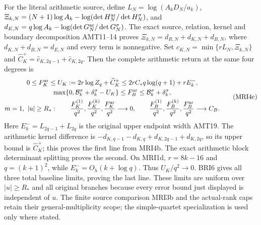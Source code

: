 \documentclass[11pt,a4paper]{article}
\begin{document}
For the literal arithmetic source, define
$L_N=\log(A_kD_N/a_k)$,
$\Xi_{k,N}=(N+1)\log A_k-\log(\det H_N^{\rm ar}/\det H_N^\sigma)$,
and $d_{E,N}=q\log A_k-\log(\det G_N^{\rm ar}/\det G_N^\sigma)$.
The exact source, relation, kernel and boundary decomposition
AMT11--14 proves $\Xi_{k,N}=d_{R,N}+d_{K,N}+d_{B,N}$,
where $d_{K,N}+d_{B,N}=d_{E,N}$ and every term is nonnegative.
Set $\widehat c_{K,N}=\min\{rL_N,\Xi_{k,N}\}$ and
$\widehat C_K^+=\widehat c_{K,2q-1}+\widehat c_{K,2q}$.
Then the complete arithmetic return at the same four degrees is
\[
\begin{gathered}
 0\le F_K^{\rm ar}\le U_K:=2r\log Z_q+\widehat C_K^+
              \le2rC_*q\log(q+1)+rE_k^-,\\
 \max\{0,\mathcal B_k^\sigma+\delta_k^\sigma-U_K\}
       \le F_B^{\rm ar}\le\mathcal B_k^\sigma+\delta_k^\sigma,\\
 m=1,\ |u|\ge R_*:\qquad
 \frac{F_K^{(1)}}{q^2},\frac{F_K^{(k)}}{q^2},
 \frac{F_K^{\rm ar}}{q^2}\longrightarrow0,\qquad
 \frac{F_B^{(1)}}{q^2},\frac{F_B^{(k)}}{q^2},
 \frac{F_B^{\rm ar}}{q^2}\longrightarrow C_B.
\end{gathered}\tag{MRI4c}
\]
Here $E_k^-=L_{2q-1}+L_{2q}$ is the original upper endpoint
width AMT19. The arithmetic kernel difference is
$-d_{K,q-1}-d_{K,q}+d_{K,2q-1}+d_{K,2q}$, so its upper
bound is $\widehat C_K^+$; this proves the first line from
MRI4b. The exact arithmetic block determinant splitting
proves the second. On MRI1d, $r=8k-16$ and $q=(k+1)^2$,
while $E_k^-=O_h(k+\log q)$. Thus $U_K/q^2\to0$.
BRI6 gives all three total baseline limits, proving the last
line. These limits are uniform over $|u|\ge R_*$ and all
original branches because every error bound just displayed is
independent of $u$. The finite source comparison MRI3b and
the actual-rank caps retain their general-multiplicity scope;
the simple-quartet specialization is used only where stated.
\end{document}
